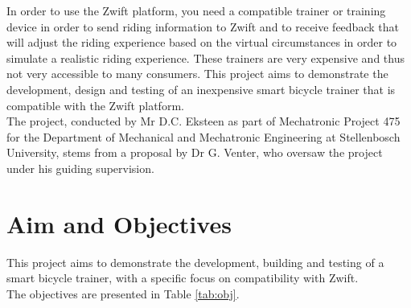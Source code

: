 In order to use the Zwift platform, you need a compatible trainer or training device in order to send riding information to Zwift and to receive feedback that will adjust the riding experience based on the virtual circumstances in order to simulate a realistic riding experience. These trainers are very expensive and thus not very accessible to many consumers. This project aims to demonstrate the development, design and testing of an inexpensive smart bicycle trainer that is compatible with the Zwift platform.\\

The project, conducted by Mr D.C. Eksteen as part of Mechatronic Project 475 for the Department of Mechanical and Mechatronic Engineering at Stellenbosch University, stems from a proposal by Dr G. Venter, who oversaw the project under his guiding supervision.

\section{Aim and Objectives}

This project aims to demonstrate the development, building and testing of a smart bicycle trainer, with a specific focus on compatibility with Zwift.\\
The objectives are presented in Table \ref{tab:obj}.

